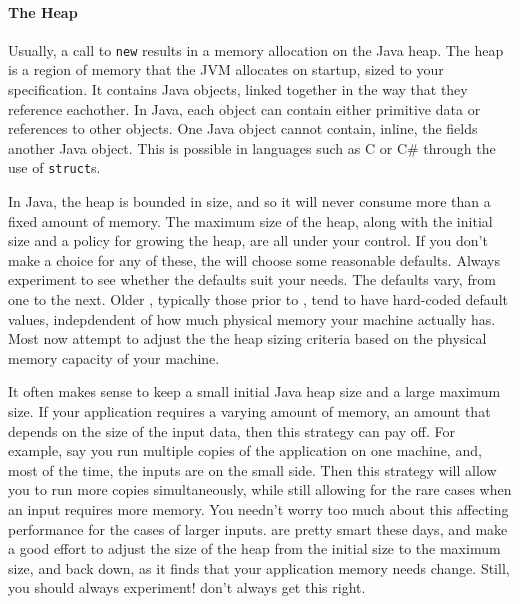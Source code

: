 
\paragraph{The Heap}
Usually, a call to {\tt new} results in a memory allocation on the Java heap.
The heap is a region of memory that the JVM allocates on startup, sized to your
specification. It contains Java objects, linked together in the way that they
reference eachother. In Java, each object can contain either primitive data or
references to other objects. One Java object cannot contain, inline, the fields
another Java object. This is possible in languages such as C or C\# through the
use of {\tt struct}s.

In Java, the heap is bounded in size, and so it will never consume more than a
fixed amount of memory. The maximum size of the heap, along with the initial
size and a policy for growing the heap, are all under your control. If you don't
make a choice for any of these, the \jre will choose some reasonable defaults.
Always experiment to see whether the defaults suit your needs.  The defaults
vary, from one \jre to the next. Older \jres, typically those prior to
\javafive, tend to have hard-coded default values, indepdendent of how much
physical memory your machine actually has. Most \jres now attempt to adjust the
the heap sizing criteria based on the physical memory capacity of your machine.

It often makes sense to keep a small initial Java heap size and a large maximum
size.  If your application requires a varying amount of memory, an amount that
depends on the size of the input data, then this strategy can pay off. For
example, say you run multiple copies of the application on one machine, and,
most of the time, the inputs are on the small side. Then this strategy will
allow you to run more copies simultaneously, while still allowing for the rare
cases when an input requires more memory. You needn't worry too much about this
affecting performance for the cases of larger inputs. \jres are pretty smart
these days, and make a good effort to adjust the size of the heap from the
initial size to the maximum size, and back down, as it finds that your
application memory needs change. Still, you should always experiment! \jres
don't always get this right.

